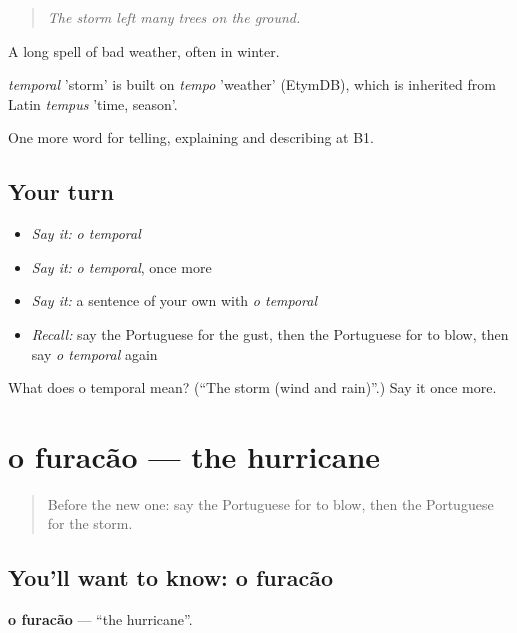 \begin{quote}
\emph{The storm left many trees on the ground.}
\end{quote}

A long spell of bad weather, often in winter.

\begin{cousinweb}
\emph{temporal} 'storm' is built on \emph{tempo} 'weather' (EtymDB), which is inherited from Latin \emph{tempus} 'time, season'.
\end{cousinweb}

\begin{grammarlens}[title={What you've built}]
One more word for telling, explaining and describing at B1.
\end{grammarlens}

\subsection*{Your turn}
\begin{itemize}
\raggedright
  \item \emph{Say it:} \emph{o temporal}
  \item \emph{Say it:} \emph{o temporal}, once more
  \item \emph{Say it:} a sentence of your own with \emph{o temporal}
  \item \emph{Recall:} say the Portuguese for the gust, then the Portuguese for to blow, then say \emph{o temporal} again
\end{itemize}

\begin{tcolorbox}[breakable,colback=teal!4,colframe=teal!35!black,title={Before you move on}]
What does o temporal mean? (\textquotedblleft{}The storm (wind and rain)\textquotedblright{}.) Say it once more.
\end{tcolorbox}
\section[o furacão]{o furacão — the hurricane}

\label{lesson:PT-C465-furacao}



\begin{quote}
Before the new one: say the Portuguese for to blow, then the Portuguese for the storm.
\end{quote}

\subsection*{You'll want to know: o furacão}
\textbf{o furacão} — \textquotedblleft{}the hurricane\textquotedblright{}.

